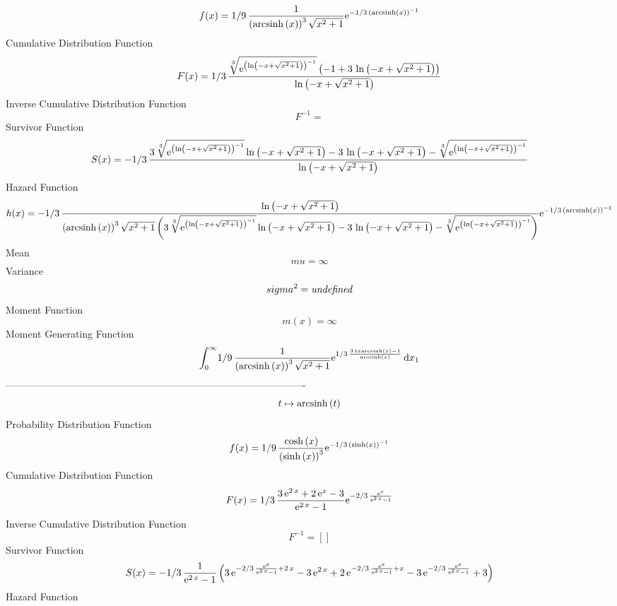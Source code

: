 \documentclass[12pt]{article}
\begin{document}
$$  f(x)=1/9\,{\frac {1}{ \left( {\rm arcsinh} \left(x\right) \right) ^{3}
\sqrt {{x}^{2}+1}}{{\rm e}^{-1/3\, \left( {\rm arcsinh} \left(x\right)
 \right) ^{-1}}}}
$$Cumulative Distribution Function  
 $$F(x)=1/3\,{\frac {\sqrt [3]{{{\rm e}^{ \left( \ln  \left( -x+\sqrt {{x}^{2}
+1} \right)  \right) ^{-1}}}} \left( -1+3\,\ln  \left( -x+\sqrt {{x}^{
2}+1} \right)  \right) }{\ln  \left( -x+\sqrt {{x}^{2}+1} \right) }}
$$ Inverse Cumulative Distribution Function 
  $$F^{-1} =  
$$Survivor Function 
 $$ S(x)=-1/3\,{\frac {3\,\sqrt [3]{{{\rm e}^{ \left( \ln  \left( -x+\sqrt {{x}
^{2}+1} \right)  \right) ^{-1}}}}\ln  \left( -x+\sqrt {{x}^{2}+1}
 \right) -3\,\ln  \left( -x+\sqrt {{x}^{2}+1} \right) -\sqrt [3]{{
{\rm e}^{ \left( \ln  \left( -x+\sqrt {{x}^{2}+1} \right)  \right) ^{-
1}}}}}{\ln  \left( -x+\sqrt {{x}^{2}+1} \right) }}
$$ Hazard Function 
 $$ h(x)=-1/3\,{\frac {\ln  \left( -x+\sqrt {{x}^{2}+1} \right) }{ \left( 
{\rm arcsinh} \left(x\right) \right) ^{3}\sqrt {{x}^{2}+1} \left( 3\,
\sqrt [3]{{{\rm e}^{ \left( \ln  \left( -x+\sqrt {{x}^{2}+1} \right) 
 \right) ^{-1}}}}\ln  \left( -x+\sqrt {{x}^{2}+1} \right) -3\,\ln 
 \left( -x+\sqrt {{x}^{2}+1} \right) -\sqrt [3]{{{\rm e}^{ \left( \ln 
 \left( -x+\sqrt {{x}^{2}+1} \right)  \right) ^{-1}}}} \right) }{
{\rm e}^{-1/3\, \left( {\rm arcsinh} \left(x\right) \right) ^{-1}}}}
$$Mean 
 $$ mu=\infty 
$$ Variance 
 $$ sigma^2 = {\it undefined}
$$Moment Function 
 $$ m(x) = \infty 
$$ Moment Generating Function 
 $$\int_{0}^{\infty }\!1/9\,{\frac {1}{ \left( {\rm arcsinh} \left(x
\right) \right) ^{3}\sqrt {{x}^{2}+1}}{{\rm e}^{1/3\,{\frac {3\,tx
{\rm arcsinh} \left(x\right)-1}{{\rm arcsinh} \left(x\right)}}}}}
\,{\rm d}x_{{1}}
$$-------------------------------------------------------------------------------------------  \\$$t\mapsto {\rm arcsinh} \left(t\right)
$$Probability Distribution Function 
$$  f(x)=1/9\,{\frac {\cosh \left( x \right) }{ \left( \sinh \left( x \right) 
 \right) ^{3}}{{\rm e}^{-1/3\, \left( \sinh \left( x \right)  \right) 
^{-1}}}}
$$Cumulative Distribution Function  
 $$F(x)=1/3\,{\frac {3\,{{\rm e}^{2\,x}}+2\,{{\rm e}^{x}}-3}{{{\rm e}^{2\,x}}-
1}{{\rm e}^{-2/3\,{\frac {{{\rm e}^{x}}}{{{\rm e}^{2\,x}}-1}}}}}
$$ Inverse Cumulative Distribution Function 
  $$F^{-1} = []
$$Survivor Function 
 $$ S(x)=-1/3\,{\frac {1}{{{\rm e}^{2\,x}}-1} \left( 3\,{{\rm e}^{-2/3\,{\frac 
{{{\rm e}^{x}}}{{{\rm e}^{2\,x}}-1}}+2\,x}}-3\,{{\rm e}^{2\,x}}+2\,{
{\rm e}^{-2/3\,{\frac {{{\rm e}^{x}}}{{{\rm e}^{2\,x}}-1}}+x}}-3\,{
{\rm e}^{-2/3\,{\frac {{{\rm e}^{x}}}{{{\rm e}^{2\,x}}-1}}}}+3
 \right) }
$$ Hazard Function 
\end{document}
